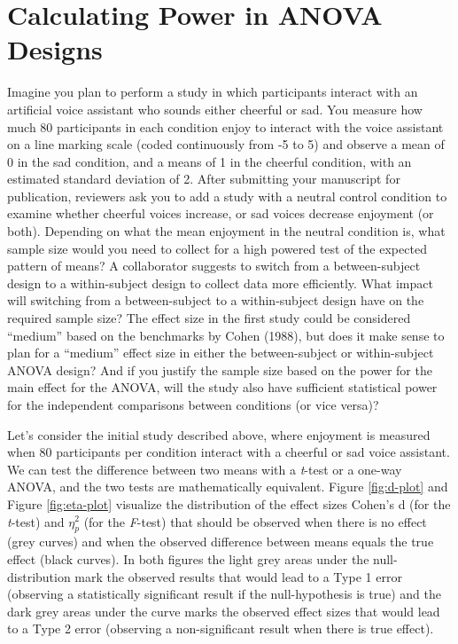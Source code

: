\documentclass[,jou,floatsintext]{apa6}
\begin{document}
\hypertarget{calculating-power-in-anova-designs}{%
\section{Calculating Power in ANOVA Designs}\label{calculating-power-in-anova-designs}}

Imagine you plan to perform a study in which participants interact with an artificial voice assistant who sounds either cheerful or sad.
You measure how much 80 participants in each condition enjoy to interact with the voice assistant on a line marking scale (coded continuously from -5 to 5) and observe a mean of 0 in the sad condition, and a means of 1 in the cheerful condition, with an estimated standard deviation of 2.
After submitting your manuscript for publication, reviewers ask you to add a study with a neutral control condition to examine whether cheerful voices increase, or sad voices decrease enjoyment (or both).
Depending on what the mean enjoyment in the neutral condition is, what sample size would you need to collect for a high powered test of the expected pattern of means?
A collaborator suggests to switch from a between-subject design to a within-subject design to collect data more efficiently.
What impact will switching from a between-subject to a within-subject design have on the required sample size?
The effect size in the first study could be considered \enquote{medium} based on the benchmarks by Cohen (1988), but does it make sense to plan for a \enquote{medium} effect size in either the between-subject or within-subject ANOVA design?
And if you justify the sample size based on the power for the main effect for the ANOVA, will the study also have sufficient statistical power for the independent comparisons between conditions (or vice versa)?

Let's consider the initial study described above, where enjoyment is measured when 80 participants per condition interact with a cheerful or sad voice assistant.
We can test the difference between two means with a \emph{t}-test or a one-way ANOVA, and the two tests are mathematically equivalent.
Figure \ref{fig:d-plot} and Figure \ref{fig:eta-plot} visualize the distribution of the effect sizes Cohen's d (for the \emph{t}-test) and \(\eta_p^2\) (for the \emph{F}-test) that should be observed when there is no effect (grey curves) and when the observed difference between means equals the true effect (black curves).
In both figures the light grey areas under the null-distribution mark the observed results that would lead to a Type 1 error (observing a statistically significant result if the null-hypothesis is true) and the dark grey areas under the curve marks the observed effect sizes that would lead to a Type 2 error (observing a non-significant result when there is true effect).
\end{document}
